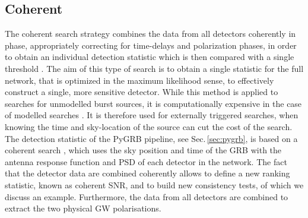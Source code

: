 \documentclass[binding=0.6cm, LaM]{sapthesis}
\begin{document}
\subsection{Coherent}
\label{subsec:coherent}
	The coherent search strategy combines the data from all detectors coherently in phase, 
	appropriately correcting for time-delays and polarization phases, in order
	to obtain an individual detection statistic which is then compared with a single threshold \cite{18}. 
	The aim of this type of search is to obtain a single statistic for the full 
	network, that is optimized in the maximum likelihood sense, 
	to effectively construct a single, more sensitive detector.
 	While this method is applied to searches for unmodelled burst sources,
        it is computationally expensive in the case of modelled searches \cite{45}.  
	It is therefore used for externally triggered searches, 
	when knowing the time and sky-location of the source can cut the cost of the search.
	The detection statistic of the {\ttfamily PyGRB} pipeline, see Sec.\,\ref{sec:pygrb}, 
	is based on a coherent search \cite{46, 92},
	which uses the sky position and time of the GRB with the antenna response function and PSD of each detector in the network. 
        The fact that the detector data are combined coherently allows to define a new ranking statistic, 
	known as coherent SNR, and to build new consistency tests, of which we discuss an example.
	Furthermore, the data from all detectors are combined to extract the two physical GW polarisations. 
\end{document}

